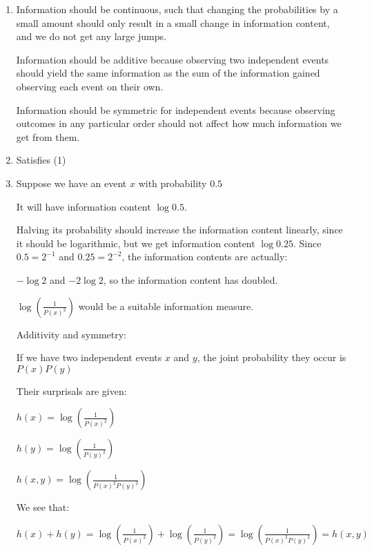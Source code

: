 


    \begin{enumerate}

      \item
        Information should be continuous, such that changing the probabilities by a small amount should only result in a small change in information content, and we do not get any large jumps.
        
        Information should be additive because observing two independent events should yield the same information as the sum of the information gained observing each event on their own.

        Information should be symmetric for independent events because observing outcomes in any particular order should not affect how much information we get from them.

        \item
          Satisfies (1)

          \item

            Suppose we have an event $x$ with probability $0.5$

            It will have information content $\log 0.5$.

            Halving its probability should increase the information content linearly, since it should be logarithmic, but we get information content $\log 0.25$. Since $0.5 = 2^{-1}$ and $0.25 = 2^{-2}$, the information contents are actually:

            $-\log 2$ and $-2\log 2$, so the information content has doubled.

            $\log(\frac{1}{P(x)^2})$ would be a suitable information measure.

            Additivity and symmetry:

            If we have two independent events $x$ and $y$, the joint probability they occur is $P(x)P(y)$

            Their surprisals are given:

            $h(x) = \log(\frac{1}{P(x)^2})$

            $h(y) = \log(\frac{1}{P(y)^2})$

            $h(x,y) = \log(\frac{1}{P(x)^2P(y)^2})$

            We see that:

            $h(x) + h(y) = \log(\frac{1}{P(x)^2}) + \log(\frac{1}{P(y)^2}) = \log(\frac{1}{P(x)^2P(y)^2}) = h(x,y)$


\end{enumerate}
